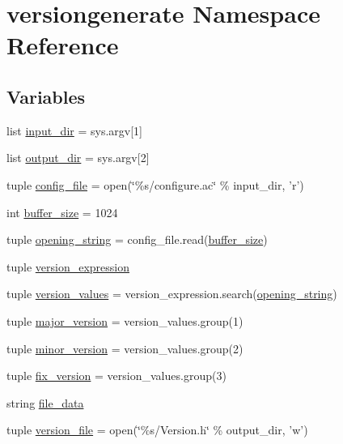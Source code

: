 \hypertarget{namespaceversiongenerate}{\section{versiongenerate \-Namespace \-Reference}
\label{d3/d03/namespaceversiongenerate}
}
\subsection*{\-Variables}
\begin{DoxyCompactItemize}
\item 
list \hyperlink{namespaceversiongenerate_ab23e267aae4e1eeda524f6c6feaab267}{input\-\_\-dir} = sys.\-argv\mbox{[}1\mbox{]}
\item 
list \hyperlink{namespaceversiongenerate_ae82ead30c0dfff23c81a0aa557d3602f}{output\-\_\-dir} = sys.\-argv\mbox{[}2\mbox{]}
\item 
tuple \hyperlink{namespaceversiongenerate_ae6512f1802b7f1f9cc6f196a0938db60}{config\-\_\-file} = open(\char`\"{}\%s/configure.\-ac\char`\"{} \% input\-\_\-dir, 'r')
\item 
int \hyperlink{namespaceversiongenerate_af22ff4ab7a026e6c3b4b08eafb2df027}{buffer\-\_\-size} = 1024
\item 
tuple \hyperlink{namespaceversiongenerate_a8e26931bb0a705d8513c611d655b676e}{opening\-\_\-string} = config\-\_\-file.\-read(\hyperlink{namespaceversiongenerate_af22ff4ab7a026e6c3b4b08eafb2df027}{buffer\-\_\-size})
\item 
tuple \hyperlink{namespaceversiongenerate_ac98c4fe7ce8062977b7c87a7befa10a1}{version\-\_\-expression}
\item 
tuple \hyperlink{namespaceversiongenerate_a35eb88dbd6495135f918fcd2966afe32}{version\-\_\-values} = version\-\_\-expression.\-search(\hyperlink{namespaceversiongenerate_a8e26931bb0a705d8513c611d655b676e}{opening\-\_\-string})
\item 
tuple \hyperlink{namespaceversiongenerate_ac557741270717fefb4c17ddc82079890}{major\-\_\-version} = version\-\_\-values.\-group(1)
\item 
tuple \hyperlink{namespaceversiongenerate_a0c85aae24f1a132c061845c52511f5a5}{minor\-\_\-version} = version\-\_\-values.\-group(2)
\item 
tuple \hyperlink{namespaceversiongenerate_ab2bab3169056e57b2e0e10df8eac77aa}{fix\-\_\-version} = version\-\_\-values.\-group(3)
\item 
string \hyperlink{namespaceversiongenerate_a0cb0dcaab1cc3237a0c88b100cab3b32}{file\-\_\-data}
\item 
tuple \hyperlink{namespaceversiongenerate_afa99387d0fcf7e17fe4328fcdc9e9b09}{version\-\_\-file} = open(\char`\"{}\%s/\-Version.\-h\char`\"{} \% output\-\_\-dir, 'w')
\end{DoxyCompactItemize}


